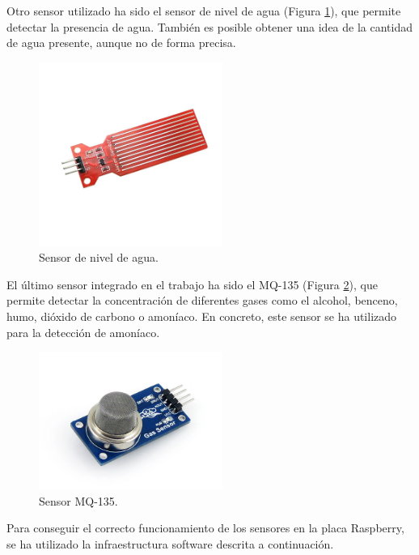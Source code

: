Otro sensor utilizado ha sido el sensor de nivel de agua (Figura \ref{fig:nivel_of}), que permite detectar la presencia de agua. También es posible obtener una idea de la cantidad de agua presente, aunque no de forma precisa.\\
\begin{figure} [h!]
  \begin{center}
    \includegraphics[width=6cm]{figs/nivel_of}
  \end{center}
  \caption{Sensor de nivel de agua.}
  \label{fig:nivel_of}
\end{figure}

El último sensor integrado en el trabajo ha sido el MQ-135 (Figura \ref{fig:mq_of}), que permite detectar la concentración de diferentes gases como el alcohol, benceno, humo, dióxido de carbono o amoníaco. En concreto, este sensor se ha utilizado para la detección de amoníaco.\\
\begin{figure} [h!]
  \begin{center}
    \includegraphics[width=6cm]{figs/mq_of}
  \end{center}
  \caption{Sensor MQ-135.}
  \label{fig:mq_of}
\end{figure}

Para conseguir el correcto funcionamiento de los sensores en la placa Raspberry, se ha utilizado la infraestructura software descrita a continuación.\\

